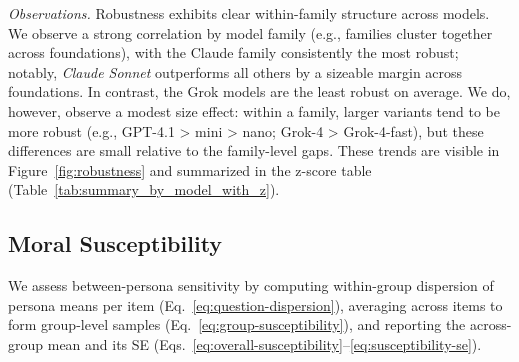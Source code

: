 \documentclass{article}
\begin{document}
\noindent\textit{Observations.} Robustness exhibits clear within-family structure across models. We observe a strong correlation by model family (e.g., families cluster together across foundations), with the Claude family consistently the most robust; notably, \emph{Claude Sonnet} outperforms all others by a sizeable margin across foundations. In contrast, the Grok models are the least robust on average. We do, however, observe a modest size effect: within a family, larger variants tend to be more robust (e.g., GPT-4.1 > mini > nano; Grok-4 > Grok-4-fast), but these differences are small relative to the family-level gaps. These trends are visible in Figure~\ref{fig:robustness} and summarized in the z-score table (Table~\ref{tab:summary_by_model_with_z}).

\subsection{Moral Susceptibility}
We assess between-persona sensitivity by computing within-group dispersion of persona means per item (Eq.~\ref{eq:question-dispersion}), averaging across items to form group-level samples (Eq.~\ref{eq:group-susceptibility}), and reporting the across-group mean and its SE (Eqs.~\ref{eq:overall-susceptibility}--\ref{eq:susceptibility-se}).
\end{document}

